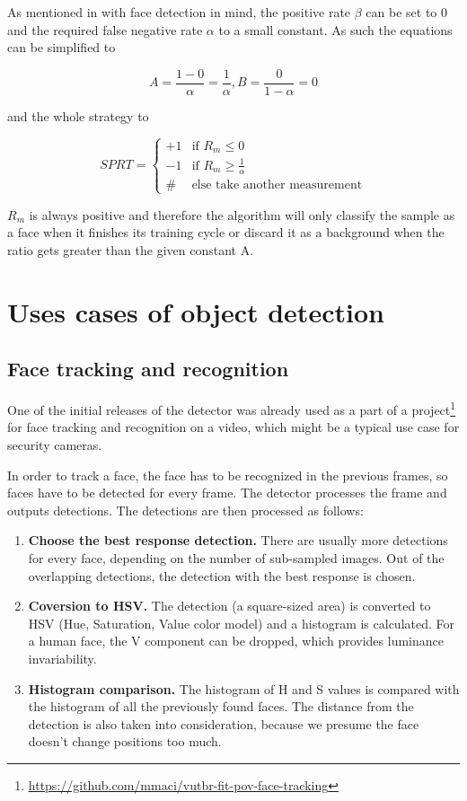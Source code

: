 As mentioned in \cite{sochman-matas-waldboost} with face detection in mind, the positive rate $\beta$ can be set to 0 and the required false negative rate $\alpha$ to a small constant. As such the equations can be simplified to

\begin{equation}
A=\frac{1-0}{\alpha}=\frac{1}{\alpha}, B=\frac{0}{1-\alpha}=0
\end{equation}

and the whole strategy to

\[
 SPRT =
  \begin{cases}
   +1 & \text{if } R_{m} \leq 0 \\
   -1 & \text{if } R_{m} \geq \frac{1}{\alpha} \\
   \# & \text{else take another measurement} 
  \end{cases}
\]

$R_{m}$ is always positive and therefore the algorithm will only classify the sample as a face when it finishes its training cycle or discard it as a background when the ratio gets greater than the given constant A.

\section{Uses cases of object detection}

\subsection{Face tracking and recognition}\label{subsec:face-tracking}

One of the initial releases of the detector was already used as a part of a project\footnote{\url{https://github.com/mmaci/vutbr-fit-pov-face-tracking}} for face tracking and recognition on a video, which might be a typical use case for security cameras.

In order to track a face, the face has to be recognized in the previous frames, so faces have to be detected for every frame. The detector processes the frame and outputs detections. The detections are then processed as follows:

\begin{enumerate}
	\item \textbf{Choose the best response detection.} There are usually more detections for every face, depending on the number of sub-sampled images. Out of the overlapping detections, the detection with the best response is chosen.
	\item \textbf{Coversion to HSV.} The detection (a square-sized area) is converted to HSV (Hue, Saturation, Value color model) and a histogram is calculated. For a human face, the V component can be dropped, which provides luminance invariability.
	\item \textbf{Histogram comparison.} The histogram of H and S values is compared with the histogram of all the previously found faces. The distance from the detection is also taken into consideration, because we presume the face doesn't change positions too much.
\end{enumerate}


